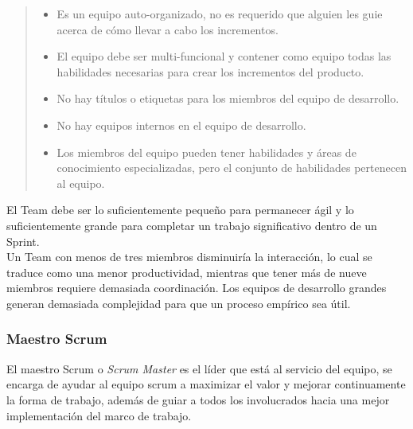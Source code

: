     \begin{quote}
    \begin{itemize}
        \item Es un equipo auto-organizado, no es requerido que alguien les guie
              acerca de cómo llevar a cabo los incrementos.

        \item El equipo debe ser multi-funcional y contener como equipo todas las
              habilidades necesarias para crear los incrementos del producto.

        \item No hay títulos o etiquetas para los miembros del equipo de desarrollo.

        \item No hay equipos internos en el equipo de desarrollo.

        \item Los miembros del equipo pueden tener habilidades y áreas de conocimiento
              especializadas, pero el conjunto de habilidades pertenecen al equipo.
    \end{itemize}
    \end{quote}
        
 \noindent El Team debe ser lo suficientemente pequeño para permanecer ágil y lo suficientemente grande
 para completar un trabajo significativo dentro de un Sprint.\\
        
 \noindent Un Team con menos de tres miembros disminuiría la interacción, lo cual se traduce como una
 menor productividad, mientras que tener más de nueve miembros requiere demasiada coordinación. Los
 equipos de desarrollo grandes generan demasiada complejidad para que un proceso empírico sea útil.

\clearpage

\subsubsection{Maestro Scrum}

 El maestro Scrum o {\it Scrum Master} es el líder que está al servicio del equipo,
 se encarga de ayudar al equipo scrum a maximizar el valor y mejorar continuamente la
 forma de trabajo, además de guiar a todos los involucrados hacia una mejor implementación
 del marco de trabajo.

